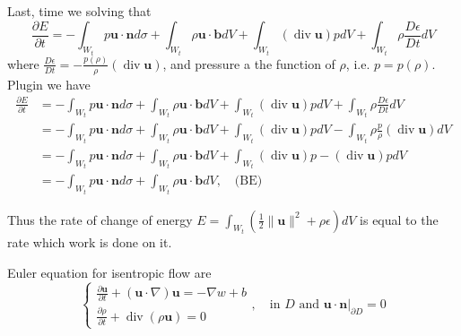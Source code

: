 Last, time we solving that
\begin{equation}
\frac{\partial E}{\partial t} = -\int_{W_t} p\textbf{u}\cdot\textbf{n}d\sigma
+ \int_{W_t}\rho\textbf{u}\cdot\textbf{b}dV
+ \int_{W_t} (\operatorname{div}\textbf{u})pdV
+ \int_{W_t} \rho\frac{D\epsilon}{Dt}dV
\end{equation}
where $\displaystyle \frac{D\epsilon}{Dt}  = -\frac{p(\rho)}{\rho}\left(\operatorname{div}\textbf{u}\right)$, and pressure a the function of $\rho$, i.e.  $p=p(\rho)$. Plugin we have
\begin{equation}
\begin{aligned}
\frac{\partial E}{\partial t}
&= -\int_{W_t} p\textbf{u}\cdot\textbf{n}d\sigma
+ \int_{W_t}\rho\textbf{u}\cdot\textbf{b}dV
+ \int_{W_t} (\operatorname{div}\textbf{u})pdV
+ \int_{W_t} \rho\frac{D\epsilon}{Dt}dV\\
&= -\int_{W_t} p\textbf{u}\cdot\textbf{n}d\sigma
+ \int_{W_t}\rho\textbf{u}\cdot\textbf{b}dV
+ \int_{W_t} (\operatorname{div}\textbf{u})pdV
- \int_{W_t} \rho \frac{p}{\rho}\left(\operatorname{div}\textbf{u}\right)dV\\
&= -\int_{W_t} p\textbf{u}\cdot\textbf{n}d\sigma
+ \int_{W_t}\rho\textbf{u}\cdot\textbf{b}dV
+ \int_{W_t} (\operatorname{div}\textbf{u})p
-  \left(\operatorname{div}\textbf{u}\right)pdV\\
&= -\int_{W_t} p\textbf{u}\cdot\textbf{n}d\sigma + \int_{W_t}\rho\textbf{u}\cdot\textbf{b}dV,\quad\text{(BE)}
\end{aligned}
\end{equation}


Thus the rate of change of energy $\displaystyle E=\int_{W_t}\left(\frac{1}{2}\lVert\textbf{u}\rVert^2 + \rho\epsilon\right)dV$  is equal to the rate which work is done on it.

Euler equation for isentropic flow are
\begin{equation}
\begin{cases}
\displaystyle \frac{\partial \textbf{u}}{\partial t} + \left(\textbf{u}\cdot \nabla\right)\textbf{u} =-\nabla w+b\\
\displaystyle \frac{\partial \rho}{\partial t} + \operatorname{div}(\rho \textbf{u})=0
\end{cases},\quad\text{in $D$ and $\textbf{u}\cdot\textbf{n}\bigg|_{\partial D} = 0$}
\end{equation}



